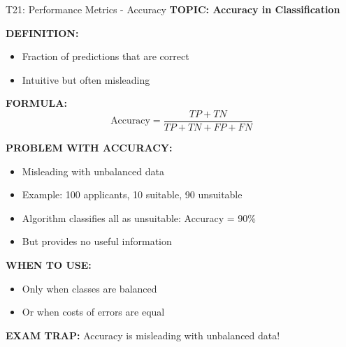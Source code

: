 \documentclass[8pt]{beamer}
\begin{document}
	\begin{frame}{T21: Performance Metrics - Accuracy}
		\fontsize{6.5}{7.5}\selectfont
		\textbf{TOPIC: Accuracy in Classification}
		
		\vspace{0.1cm}
		\textbf{DEFINITION:}
		\begin{itemize}
			\item Fraction of predictions that are correct
			\item Intuitive but often misleading
		\end{itemize}
		
		\vspace{0.1cm}
		\textbf{FORMULA:}
		\[
		\text{Accuracy} = \frac{TP+TN}{TP+TN+FP+FN}
		\]
		
		\vspace{0.1cm}
		\textbf{PROBLEM WITH ACCURACY:}
		\begin{itemize}
			\item Misleading with unbalanced data
			\item Example: 100 applicants, 10 suitable, 90 unsuitable
			\item Algorithm classifies all as unsuitable: Accuracy = 90\%
			\item But provides no useful information
		\end{itemize}
		
		\vspace{0.1cm}
		\textbf{WHEN TO USE:}
		\begin{itemize}
			\item Only when classes are balanced
			\item Or when costs of errors are equal
		\end{itemize}
		
		\textcolor{myred}{\textbf{EXAM TRAP:}} Accuracy is \textcolor{myblue}{misleading with unbalanced data}!
	\end{frame}
	
\end{document}
